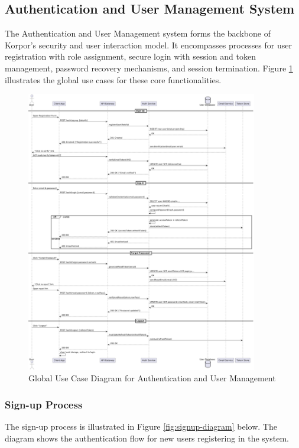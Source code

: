 \subsection{Authentication and User Management System}
The Authentication and User Management system forms the backbone of Korpor's security and user interaction model. It encompasses processes for user registration with role assignment, secure login with session and token management, password recovery mechanisms, and session termination. Figure \ref{fig:auth-usermgmt-usecase} illustrates the global use cases for these core functionalities.

\begin{figure}[htbp]
    \centering
    \includegraphics[width=0.9\textwidth]{images/auth-usermgmt-usecase.png} 
    \caption{Global Use Case Diagram for Authentication and User Management}
    \label{fig:auth-usermgmt-usecase}
\end{figure}
\newpage

\subsubsection{Sign-up Process}
The sign-up process is illustrated in Figure \ref{fig:signup-diagram} below. The diagram shows the authentication flow for new users registering in the system.

